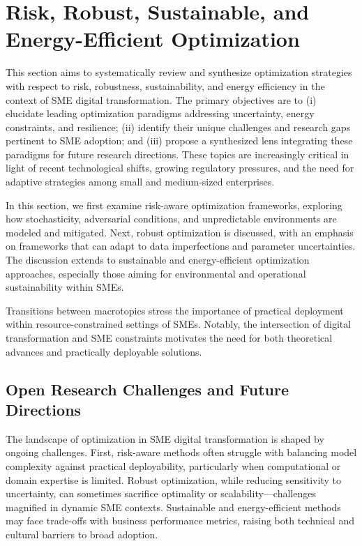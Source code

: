 \documentclass[sigconf]{acmart}
\begin{document}
\section{Risk, Robust, Sustainable, and Energy-Efficient Optimization}

This section aims to systematically review and synthesize optimization strategies with respect to risk, robustness, sustainability, and energy efficiency in the context of SME digital transformation. The primary objectives are to (i) elucidate leading optimization paradigms addressing uncertainty, energy constraints, and resilience; (ii) identify their unique challenges and research gaps pertinent to SME adoption; and (iii) propose a synthesized lens integrating these paradigms for future research directions. These topics are increasingly critical in light of recent technological shifts, growing regulatory pressures, and the need for adaptive strategies among small and medium-sized enterprises.

In this section, we first examine risk-aware optimization frameworks, exploring how stochasticity, adversarial conditions, and unpredictable environments are modeled and mitigated. Next, robust optimization is discussed, with an emphasis on frameworks that can adapt to data imperfections and parameter uncertainties. The discussion extends to sustainable and energy-efficient optimization approaches, especially those aiming for environmental and operational sustainability within SMEs.

Transitions between macrotopics stress the importance of practical deployment within resource-constrained settings of SMEs. Notably, the intersection of digital transformation and SME constraints motivates the need for both theoretical advances and practically deployable solutions.

\subsection{Open Research Challenges and Future Directions}

The landscape of optimization in SME digital transformation is shaped by ongoing challenges. First, risk-aware methods often struggle with balancing model complexity against practical deployability, particularly when computational or domain expertise is limited. Robust optimization, while reducing sensitivity to uncertainty, can sometimes sacrifice optimality or scalability—challenges magnified in dynamic SME contexts. Sustainable and energy-efficient methods may face trade-offs with business performance metrics, raising both technical and cultural barriers to broad adoption.
\end{document}
